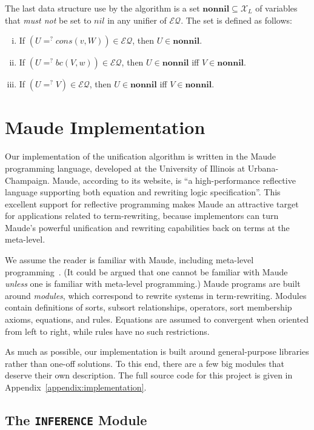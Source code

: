 \documentclass[11pt]{article}
\newcommand{\ueq}{=_{}^?}
\newcommand{\X}{\mathcal{X}}
\newcommand{\EQ}{\mathcal{EQ}}
\newcommand{\Bc}{\mathit{bc}}
\newcommand{\Cons}{\mathit{cons}}
\newcommand{\Nil}{\mathit{nil}}
\newcommand{\Nonnil}{\mathbf{nonnil}}
\newcommand{\TitleListing}[1]{\texorpdfstring{\lstinline|#1|}{#1}}
\begin{document}
The last data structure use by the algorithm is a set $\Nonnil \subseteq \X_L$
of variables that \emph{must not} be set to $\Nil$ in any unifier of $\EQ$. The
set is defined as follows:
\begin{enumerate}[(i)]
    \item If $(U \ueq \Cons(v, W)) \in \EQ$, then $U \in \Nonnil$.
    \item If $(U \ueq \Bc(V, w)) \in \EQ$, then $U \in \Nonnil$ iff $V \in \Nonnil$.
    \item If $(U \ueq V) \in \EQ$, then $U \in \Nonnil$ iff $V \in \Nonnil$.
\end{enumerate}

\section{Maude Implementation}\label{section:maude}

Our implementation of the unification algorithm is written in the Maude
programming language, developed at the University of Illinois at
Urbana-Champaign. Maude, according to its website, is ``a high-performance
reflective language supporting both equation and rewriting logic
specification''. This excellent support for reflective programming makes Maude
an attractive target for applications related to term-rewriting, because
implementors can turn Maude's powerful unification and rewriting capabilities
back on terms at the meta-level.

We assume the reader is familiar with Maude, including meta-level
programming~\cite{clavel2011maude}. (It could be argued that one cannot be
familiar with Maude \emph{unless} one is familiar with meta-level programming.)
Maude programs are built around \emph{modules}, which correspond to rewrite
systems in term-rewriting. Modules contain definitions of sorts, subsort
relationships, operators, sort membership axioms, equations, and rules.
Equations are assumed to convergent when oriented from left to right, while
rules have no such restrictions.

As much as possible, our implementation is built around general-purpose
libraries rather than one-off solutions. To this end, there are a few big
modules that deserve their own description. The full source code for this
project is given in Appendix~\ref{appendix:implementation}.

\subsection{The \TitleListing{INFERENCE} Module}\label{subsection:inference-mod}
\end{document}

